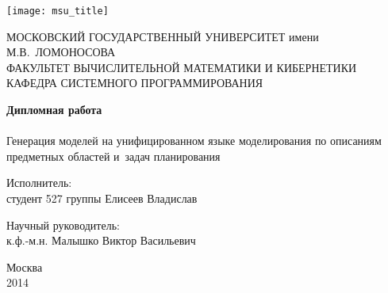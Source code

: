 \begin{titlepage}

\begin{center}

\texttt{[image: msu\_title]}

{\small
МОСКОВСКИЙ ГОСУДАРСТВЕННЫЙ УНИВЕРСИТЕТ имени М.В.~ЛОМОНОСОВА \\
ФАКУЛЬТЕТ ВЫЧИСЛИТЕЛЬНОЙ МАТЕМАТИКИ И КИБЕРНЕТИКИ \\
КАФЕДРА СИСТЕМНОГО ПРОГРАММИРОВАНИЯ
}
\end{center}

\vfill
\vfill
\begin{center}
\Large{\textbf{Дипломная работа}} \\
~\\
\Large{Генерация моделей на унифицированном языке моделирования по описаниям предметных областей и~задач планирования}
\end{center}
\vfill
\vfill
\vfill
\vfill
\begin{flushright}
Исполнитель: \\
студент 527 группы Елисеев Владислав
\end{flushright}
\vfill
\begin{flushright}
Научный руководитель: \\к.ф.-м.н. Малышко Виктор Васильевич
\end{flushright}
  
\vfill
\vfill
\vfill
\vfill
\begin{center}
  Москва\\
  2014
\end{center}  
\end{titlepage}